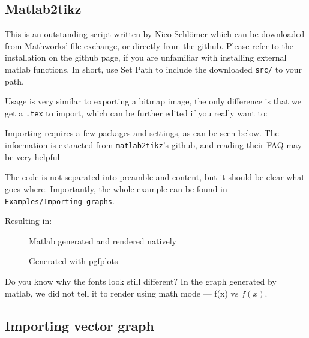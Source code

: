 \subsection{Matlab2tikz}
This is an outstanding script written by Nico Schlömer which can be downloaded from Mathworks' \href{https://uk.mathworks.com/matlabcentral/fileexchange/22022-matlab2tikz-matlab2tikz}{file exchange}, or directly from the \href{https://github.com/matlab2tikz/matlab2tikz}{github}. Please refer to the installation on the github page, if you are unfamiliar with installing external matlab functions.
In short, use Set Path to include the downloaded \verb|src/| to your path.

Usage is very similar to exporting a bitmap image, the only difference is that we get a \texttt{.tex} to import, which can be further edited if you really want to:


Importing requires a few packages and settings, as can be seen below.
The information is extracted from \texttt{matlab2tikz}'s github, and reading their \href{https://github.com/matlab2tikz/matlab2tikz/wiki/FAQ}{FAQ} may be very helpful 

The code is not separated into preamble and content, but it should be clear what goes where.
Importantly, the whole example can be found in \texttt{Examples/Importing-graphs}.

Resulting in:
\begin{figure}[h]\centering
\begin{minipage}{0.49\textwidth}
    \newlength\fheight{} \newlength\fwidth{}
    \setlength\fheight{5.5cm}
    \setlength\fwidth{7cm}    

\caption{Matlab generated and rendered natively}
\end{minipage}
\hfill
\begin{minipage}{0.49\textwidth}
    \caption{Generated with pgfplots}
\end{minipage}
\end{figure}

Do you know why the fonts look still different? In the graph generated by matlab, we did not tell it to render using math mode --- f(x) vs \( f(x) \).

\subsection{Importing vector graph}